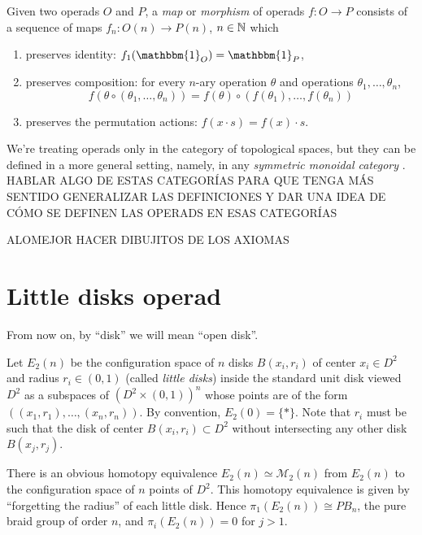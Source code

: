 \documentclass[TFM.tex]{subfiles}
\begin{document}


\begin{defi}
Given two operads $O$ and $P$, a \emph{map} or \emph{morphism} of operads $f:O\to P$ consists of a sequence of maps $f_n:O(n)\to P(n)$, $n\in\mathbb{N}$ which
\begin{enumerate}
\item preserves identity: $f_1(\mathbbm{1}_O)=\mathbbm{1}_P$,
\item preserves composition: for every $n$-ary operation $\theta$ and operations $\theta_1,\dots, \theta_n$,
\[
f(\theta\circ(\theta_1,\ldots,\theta_n))
= f(\theta)\circ(f(\theta_1),\ldots,f(\theta_n))
\]
\item  preserves the permutation actions: $f(x\cdot s)=f(x)\cdot s$.
\end{enumerate}
\end{defi}

We're treating operads only in the category of topological spaces, but they can be defined in a more general setting, namely, in any \emph{symmetric monoidal category} \cite{Yau}. HABLAR ALGO DE ESTAS CATEGORÍAS PARA QUE TENGA MÁS SENTIDO GENERALIZAR LAS DEFINICIONES Y DAR UNA IDEA DE CÓMO SE DEFINEN LAS OPERADS EN ESAS CATEGORÍAS

ALOMEJOR HACER DIBUJITOS DE LOS AXIOMAS


\section{Little disks operad}

From now on, by ``disk'' we will mean ``open disk''. 
 
 Let $E_2(n)$ be the configuration space of $n$ disks $B(x_i,r_i)$ of center $x_i\in D^2$ and radius $r_i\in (0,1)$ (called \emph{little disks}) inside the standard unit disk viewed $D^2$ as a subspaces of $(D^2\times (0,1))^n$ whose points are of the form $((x_1,r_1),\dots, (x_n,r_n))$. By convention, $E_2(0)=\{*\}$. Note that $r_i$ must be such that the disk of center $B(x_i,r_i)\subset D^2$ without intersecting any other disk $B(x_j,r_j)$. 
 
 There is an obvious homotopy equivalence $E_2(n)\simeq \mathcal{M}_2(n)$ from $E_2(n)$ to the configuration space of $n$ points of $D^2$. This homotopy equivalence is given by ``forgetting the radius'' of each little disk. Hence $\pi_1(E_2(n))\cong PB_n$, the pure braid group of order $n$, and $\pi_i(E_2(n))=0$ for $j>1$. 
 
\end{document}
